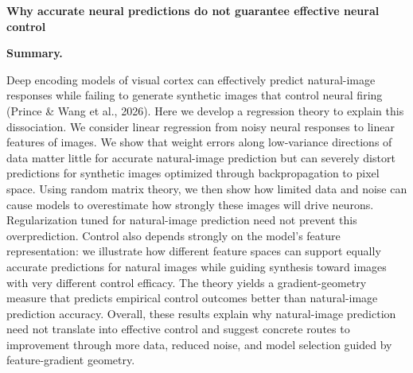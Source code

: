 \documentclass[12pt,a4paper]{article}
\begin{document}
{\large\bfseries Why accurate neural predictions do not guarantee effective neural control\par}

\textbf{Summary.}

Deep encoding models of visual cortex can effectively predict natural-image responses while failing to generate synthetic images that control neural firing (Prince \& Wang et al., 2026). Here we develop a regression theory to explain this dissociation. We consider linear regression from noisy neural responses to linear features of images. We show that weight errors along low-variance directions of data matter little for accurate natural-image prediction but can severely distort predictions for synthetic images optimized through backpropagation to pixel space. Using random matrix theory, we then show how limited data and noise can cause models to overestimate how strongly these images will drive neurons. Regularization tuned for natural-image prediction need not prevent this overprediction. Control also depends strongly on the model's feature representation: we illustrate how different feature spaces can support equally accurate predictions for natural images while guiding synthesis toward images with very different control efficacy. The theory yields a gradient-geometry measure that predicts empirical control outcomes better than natural-image prediction accuracy. Overall, these results explain why natural-image prediction need not translate into effective control and suggest concrete routes to improvement through more data, reduced noise, and model selection guided by feature-gradient geometry.
\end{document}
